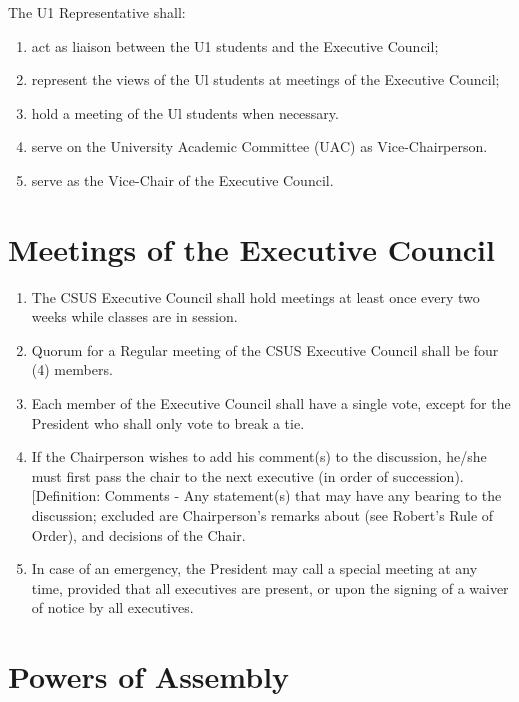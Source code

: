 The U1 Representative shall:

\begin{enumerate}
\def\labelenumi{\arabic{enumi}.}
\item
  act as liaison between the U1 students and the Executive Council;
\item
  represent the views of the Ul students at meetings of the Executive
  Council;
\item
  hold a meeting of the Ul students when necessary.
\item
  serve on the University Academic Committee (UAC) as Vice-Chairperson.
\item
  serve as the Vice-Chair of the Executive Council.
\end{enumerate}

\section{Meetings of the Executive
Council}\label{meetings-of-the-executive-council}

\begin{enumerate}
\def\labelenumi{\arabic{enumi}.}
\item
  The CSUS Executive Council shall hold meetings at least once every two
  weeks while classes are in session.
\item
  Quorum for a Regular meeting of the CSUS Executive Council shall be
  four (4) members.
\item
  Each member of the Executive Council shall have a single vote, except
  for the President who shall only vote to break a tie.
\item
  If the Chairperson wishes to add his comment(s) to the discussion,
  he/she must first pass the chair to the next executive (in order of
  succession). {[}Definition: Comments - Any statement(s) that may have
  any bearing to the discussion; excluded are Chairperson's remarks
  about (see Robert's Rule of Order), and decisions of the Chair.
\item
  In case of an emergency, the President may call a special meeting at
  any time, provided that all executives are present, or upon the
  signing of a waiver of notice by all executives.
\end{enumerate}

\section{Powers of Assembly}\label{powers-of-assembly}

